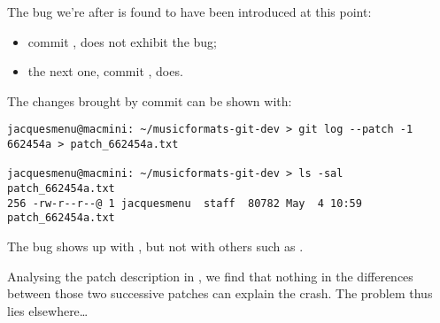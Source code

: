The bug we're after is found to have been introduced at this point:
\begin{itemize}
\item commit , does not exhibit the bug;
\item the next one, commit , does.
\end{itemize}

The changes brought by commit \code{} can be shown with: %
\begin{lstlisting}[language=Terminal]
jacquesmenu@macmini: ~/musicformats-git-dev > git log --patch -1 662454a > patch_662454a.txt

jacquesmenu@macmini: ~/musicformats-git-dev > ls -sal patch_662454a.txt
256 -rw-r--r--@ 1 jacquesmenu  staff  80782 May  4 10:59 patch_662454a.txt
\end{lstlisting}

The bug shows up with , but not with others such as .

Analysing the patch description in , we find that nothing in the differences between those two successive patches can explain  the crash. The problem thus lies elsewhere\dots



